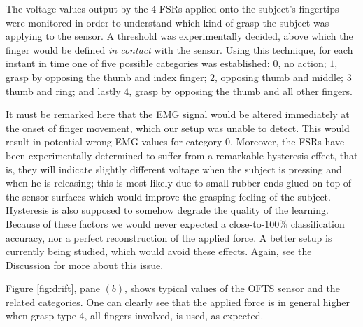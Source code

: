 The voltage values output by the $4$ FSRs applied onto the subject's
fingertips were monitored in order to understand which kind of grasp
the subject was applying to the sensor. A threshold was experimentally
decided, above which the finger would be defined \emph{in contact}
with the sensor. Using this technique, for each instant in time one of
five possible categories was established: $0$, no action; $1$, grasp
by opposing the thumb and index finger; $2$, opposing thumb and
middle; $3$ thumb and ring; and lastly $4$, grasp by opposing the
thumb and all other fingers.

It must be remarked here that the EMG signal would be altered
immediately at the onset of finger movement, which our setup was
unable to detect. This would result in potential wrong EMG values for
category $0$. Moreover, the FSRs have been experimentally determined
to suffer from a remarkable hysteresis effect, that is, they will
indicate slightly different voltage when the subject is pressing and
when he is releasing; this is most likely due to small rubber ends
glued on top of the sensor surfaces which would improve the grasping
feeling of the subject. Hysteresis is also supposed to somehow degrade
the quality of the learning. Because of these factors we would never
expected a close-to-$100\%$ classification accuracy, nor a perfect
reconstruction of the applied force. A better setup is currently being
studied, which would avoid these effects. Again, see the Discussion
for more about this issue.

Figure \ref{fig:drift}, pane $(b)$, shows typical values of the OFTS
sensor and the related categories. One can clearly see that the
applied force is in general higher when grasp type $4$, all fingers
involved, is used, as expected.
